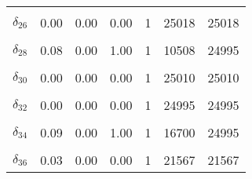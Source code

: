 \begin{longtable}[t]{lrrrrrr}
\cellcolor{gray!6}{$\delta_{25}$} & \cellcolor{gray!6}{0.26} & \cellcolor{gray!6}{0.00} & \cellcolor{gray!6}{1.00} & \cellcolor{gray!6}{1} & \cellcolor{gray!6}{7418} & \cellcolor{gray!6}{24995}\\
$\delta_{26}$ & 0.00 & 0.00 & 0.00 & 1 & 25018 & 25018\\
\cellcolor{gray!6}{$\delta_{27}$} & \cellcolor{gray!6}{0.28} & \cellcolor{gray!6}{0.00} & \cellcolor{gray!6}{1.00} & \cellcolor{gray!6}{1} & \cellcolor{gray!6}{11493} & \cellcolor{gray!6}{24995}\\
$\delta_{28}$ & 0.08 & 0.00 & 1.00 & 1 & 10508 & 24995\\
\cellcolor{gray!6}{$\delta_{29}$} & \cellcolor{gray!6}{0.16} & \cellcolor{gray!6}{0.00} & \cellcolor{gray!6}{1.00} & \cellcolor{gray!6}{1} & \cellcolor{gray!6}{19988} & \cellcolor{gray!6}{24995}\\
$\delta_{30}$ & 0.00 & 0.00 & 0.00 & 1 & 25010 & 25010\\
\cellcolor{gray!6}{$\delta_{31}$} & \cellcolor{gray!6}{0.67} & \cellcolor{gray!6}{0.00} & \cellcolor{gray!6}{1.00} & \cellcolor{gray!6}{1} & \cellcolor{gray!6}{2738} & \cellcolor{gray!6}{24995}\\
$\delta_{32}$ & 0.00 & 0.00 & 0.00 & 1 & 24995 & 24995\\
\cellcolor{gray!6}{$\delta_{33}$} & \cellcolor{gray!6}{0.00} & \cellcolor{gray!6}{0.00} & \cellcolor{gray!6}{0.00} & \cellcolor{gray!6}{1} & \cellcolor{gray!6}{24157} & \cellcolor{gray!6}{24157}\\
$\delta_{34}$ & 0.09 & 0.00 & 1.00 & 1 & 16700 & 24995\\
\cellcolor{gray!6}{$\delta_{35}$} & \cellcolor{gray!6}{0.00} & \cellcolor{gray!6}{0.00} & \cellcolor{gray!6}{0.00} & \cellcolor{gray!6}{1} & \cellcolor{gray!6}{24995} & \cellcolor{gray!6}{24995}\\
$\delta_{36}$ & 0.03 & 0.00 & 0.00 & 1 & 21567 & 21567\\*
\end{longtable}